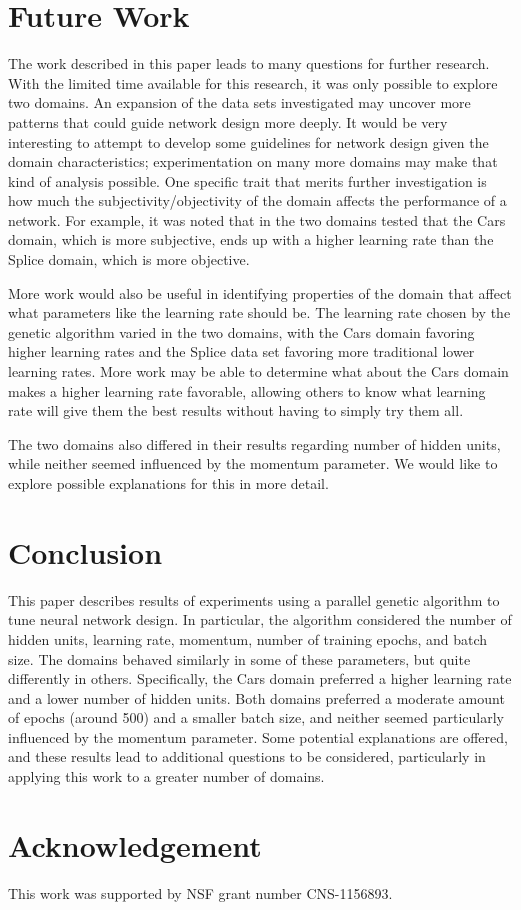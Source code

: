\documentclass[10pt, conference, compsocconf]{IEEEtran}
\begin{document}
\section{Future Work}

The work described in this paper leads to many questions for further research. With the limited time available for this research, it was only possible to explore two domains. An expansion of the data sets investigated may uncover more patterns that could guide network design more deeply. It would be very interesting to attempt to develop some guidelines for network design given the domain characteristics; experimentation on many more domains may make that kind of analysis possible. One specific trait that merits further investigation is how much the subjectivity/objectivity of the domain affects the performance of a network. For example, it was noted that in the two domains tested that the Cars domain, which is more subjective, ends up with a higher learning rate than the Splice domain, which is more objective.

More work would also be useful in identifying properties of the domain that affect what parameters like the learning rate should be. The learning rate chosen by the genetic algorithm varied in the two domains, with the Cars domain favoring higher learning rates and the Splice data set favoring more traditional lower learning rates. More work may be able to determine what about the Cars domain makes a higher learning rate favorable, allowing others to know what learning rate will give them the best results without having to simply try them all.

The two domains also differed in their results regarding number of hidden units, while neither seemed influenced by the momentum parameter. We would like to explore possible explanations for this in more detail.

\section{Conclusion}
This paper describes results of experiments using a parallel genetic algorithm to tune neural network design. In particular, the algorithm considered the number of hidden units, learning rate, momentum, number of training epochs, and batch size. The domains behaved similarly in some of these parameters, but quite differently in others. Specifically, the Cars domain preferred a higher learning rate and a lower number of hidden units. Both domains preferred a moderate amount of epochs (around 500) and a smaller batch size, and neither seemed particularly influenced by the momentum parameter. Some potential explanations are offered, and these results lead to additional questions to be considered, particularly in applying this work to a greater number of domains.

\section{Acknowledgement}
This work was supported by NSF grant number CNS-1156893.



\end{document}
